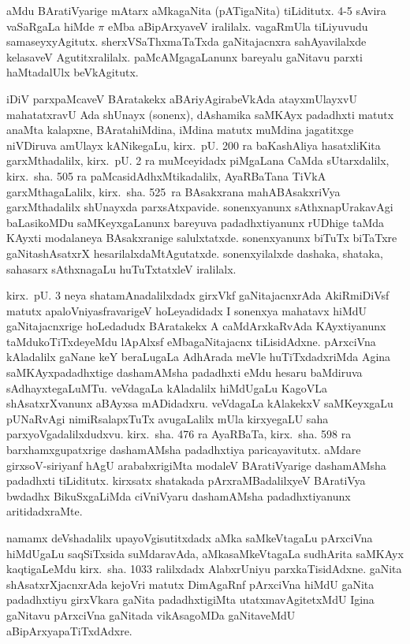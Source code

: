 aMdu BAratiVyarige mAtarx aMkagaNita (pATigaNita) tiLiditutx. {\rm 4-5} sAvira vaSaRgaLa hiMde $\pi$ eMba aBipArxyaveV iralilalx. vagaRmUla tiLiyuvudu samaseyx\-yAgitutx. sherxVSaThxmaTaTxda gaNitajacnxra sahAyavilalxde kelasaveV Agutitxralilalx. paMcAMgagaLanunx bareyalu gaNitavu parxti haMtadalUlx beVkAgitutx.

iDiV parxpaMcaveV BAratakekx  aBAriyAgirabeVkAda atayxmUlayxvU mahatatxravU Ada shUnayx (sonenx), dAshamika saMKAyx padadhxti matutx anaMta kalapxne, BArata\break hiMdina, iMdina matutx muMdina jagatitxge niVDiruva amUlayx kANikegaLu, kirx.~pU. {\rm 200} ra baKashAliya hasatxliKita garxMthadalilx, kirx.~pU. {\rm 2} ra muMceyidadx piMgaLana CaMda sUtarxdalilx, kirx.~sha. {\rm 505} ra paMcasidAdhxMtikadalilx, AyaRBaTana TiVkA garxMthagaLalilx, kirx.~sha. {\rm 525}~ra BAsakxrana mahABAsakxriVya garxMthadalilx shUnayxda parxsAtxpavide. sonenxyanunx sAthxnapUrakavAgi baLasikoMDu saMKeyxgaLanunx bareyuva padadhxtiyanunx rUDhige taMda KAyxti modalaneya BAsakxranige salulxtatxde. sonenxyanunx biTuTx biTaTxre gaNitashAsatxrX hesarilalx\-daMtAgutatxde. sonenxyilalxde dashaka, shataka, sahasarx sAthxnagaLu huTuTxtatxleV iralilalx. 

kirx.~pU. {\rm 3} neya shatamAnadalilxdadx girxVkf gaNitajacnxrAda AkiRmiDiVsf matutx apaloV\-niyasfravarigeV hoLeyadidadx I sonenxya mahatavx hiMdU gaNitajacnxrige hoLedadudx BAratakekx A caMdArxkaRvAda KAyxtiyanunx taMdukoTiTxdeyeMdu lApAlxsf eMba\break gaNitajacnx tiLisidAdxne. pArxciVna kAladalilx gaNane keY beraLugaLa AdhArada meVle huTiTxdadx\-riMda Agina saMKAyxpadadhxtige dashamAMsha padadhxti eMdu hesaru baMdiruva sAdhayxtegaLuMTu. veVdagaLa kAladalilx hiMdUgaLu KagoVLa shAsatxrXvanunx aBAyxsa mADidadxru. veVdagaLa kAlakekxV saMKeyxgaLu pUNaRvAgi nimiRsalapxTuTx avugaLalilx mUla kirxyegaLU saha parxyoVgadalilxdudxvu. kirx.~sha. {\rm 476} ra AyaRBaTa, kirx.~sha. {\rm 598} ra barxhamxgupatxrige dashamAMsha padadhxtiya paricayavitutx. aMdare girxsoV-siriyanf hAgU arababxrigiMta modaleV BAratiVyarige dashamAMsha padadhxti tiLiditutx. kirxsatx shatakada pArxraMBadalilxyeV BAratiVya bwdadhx BikuSxgaLiMda ciVniVyaru dashamAMsha padadhxtiyanunx aritidadxraMte.

namamx deVshadalilx upayoVgisutitxdadx aMka saMkeVtagaLu pArxciVna hiMdUgaLu saqSiTx\-sida suMdaravAda, aMkasaMkeVtagaLa sudhArita saMKAyx kaqtigaLeMdu kirx.~sha. {\rm 1033} ralilxdadx AlabxrUniyu parxkaTisidAdxne. gaNita shAsatxrXjacnxrAda kejoVri matutx DimAgaRnf pArxciVna hiMdU gaNita padadhxtiyu girxVkara gaNita padadhxtigiMta utatxmavAgitetxMdU Igina gaNitavu pArxciVna gaNitada vikAsagoMDa gaNitaveMdU aBipArxyapaTiTxdAdxre.

